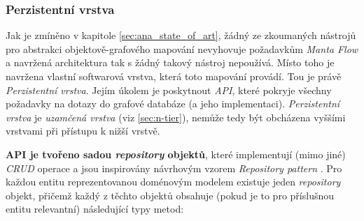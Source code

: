 \subsubsection{Perzistentní vrstva}
\label{sec:des_persistence}
Jak je zmíněno v kapitole \ref{sec:ana_state_of_art}, žádný ze zkoumaných nástrojů pro abstrakci objektově-grafového mapování nevyhovuje požadavkům \textit{Manta Flow} a navržená architektura tak s žádný takový nástroj nepoužívá. Místo toho je navržena vlastní softwarová vrstva, která toto mapování provádí. Tou je právě \textit{Perzistentní vrstva}. Jejím úkolem je poskytnout \textit{API}, které pokryje všechny požadavky na dotazy do grafové databáze (a jeho implementaci). \textit{Perzistentní vrstva} je \textit{uzamčená vrstva} (viz \ref{sec:n-tier}), nemůže tedy být obcházena vyššími vrstvami při přístupu k nižší vrstvě.

\textbf{API je tvořeno sadou \textit{repository} objektů}, které implementují (mimo jiné) \textit{CRUD} operace a jsou inspirovány návrhovým vzorem \textit{Repository pattern} \cite{Dorfmann16}. Pro každou entitu reprezentovanou doménovým modelem existuje jeden \textit{repository} objekt, přičemž každý z těchto objektů obsahuje (pokud je to pro příslušnou entitu relevantní) následující typy metod:


